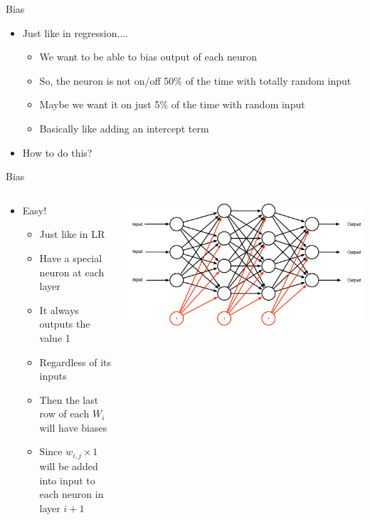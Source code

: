 \documentclass[aspectratio=169]{beamer}
\begin{document}
\begin{frame}{Bias}

\begin{itemize}
	\item Just like in regression....
	\begin{itemize}
		\item We want to be able to bias output of each neuron
		\item So, the neuron is not on/off 50\% of the time with totally random input
		\item Maybe we want it on just 5\% of the time with random input
		\item Basically like adding an intercept term
	\end{itemize}
	\item How to do this?
\end{itemize}
\end{frame}

\begin{frame}{Bias}

\begin{columns}
\begin{column}{0.5\textwidth}
\begin{itemize}
	\item Easy!
	\begin{itemize}
		\item Just like in LR
		\item Have a special neuron at each layer
		\item It always outputs the value 1
		\item Regardless of its inputs
		\item Then the last row of each $W_i$ will have biases
		\item Since $w_{i,j} \times 1$ will be added into input to each neuron in layer $i+1$
	\end{itemize}
\end{itemize}
\end{column}
\begin{column}{0.5\textwidth}
\includegraphics[width=1\textwidth]{lectFF/biasNN.pdf}
\end{column}
\end{columns}
\end{frame}
\end{document}
